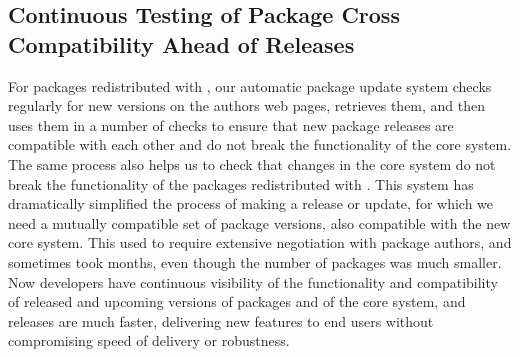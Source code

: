 







\subsection{Continuous Testing of Package Cross Compatibility Ahead of
\GAP Releases}\label{pkg-update}
For packages redistributed with \GAP, our automatic package update system
checks regularly for new versions on the authors web pages, retrieves them, and then uses them in a
number of checks to ensure that new package releases are compatible with
each other and do not break the functionality of the core \GAP system. The
same process also helps us to check that changes in the core \GAP system
do not break the functionality of the packages redistributed with \GAP.
This system has dramatically simplified the process of making a \GAP
release or update, for which we need a mutually compatible set of
package versions, also compatible with the new core system. This used
to require extensive negotiation with package authors, and sometimes
took months, even though the number of packages was much smaller. Now
developers have continuous visibility of the functionality and
compatibility of released and upcoming versions of packages and of the
core system, and releases are much faster, delivering new features to
end users without compromising speed of delivery or robustness.


